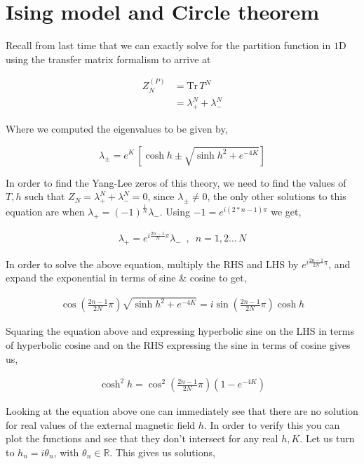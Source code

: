 \documentclass[11pt,a4paper]{article}
\begin{document}
\section{Ising model and Circle theorem}

Recall from last time that we can exactly solve for the partition function in $1$D using the transfer matrix formalism to arrive at

\begin{align}
    Z^{(P)}_N &= \text{Tr} \, T^N \nonumber \\
    &= \lambda^N_+ + \lambda^N_-
\end{align}

Where we computed the eigenvalues to be given by,

\begin{equation}
    \lambda_{\pm} = e^K \, \left[ \cosh{h} \pm \sqrt{\sinh{h}^2 + e^{-4K}} \right] \label{eq:roots}
\end{equation}

In order to find the Yang-Lee zeros of this theory, we need to find the values of $T,h$ such that $Z_N = \lambda^N_+ + \lambda^N_- = 0$, since $\lambda_{\pm} \neq 0$, the only other solutions to this equation are when $\lambda_+ = (-1)^{\frac{1}{N}} \lambda_-$. Using $-1 = e^{i(2*n-1)\pi}$ we get,

\begin{align}
    \lambda_+ =  e^{i \frac{2n-1}{ N}\pi} \lambda_-   \,\,\,,\,\,\, n = 1,2... \, N
\end{align}

In order to solve the above equation, multiply the RHS and LHS by $e^{i \frac{2n-1}{2 N}\pi}$, and expand the exponential in terms of sine \& cosine to get,

\begin{align}
    \cos{\left(\frac{2n-1}{2 N}\pi \right)} \sqrt{\sinh{h}^2 + e^{-4K}} = i \sin{\left(\frac{2n-1}{2 N}\pi \right)} \cosh{h}
\end{align}

Squaring the equation above and expressing hyperbolic sine on the LHS in terms of hyperbolic cosine and on the RHS expressing the sine in terms of cosine gives us,

\begin{align}
    \cosh^2{h} =  \cos^2{\left(\frac{2n-1}{2 N}\pi \right)} \left(1 - e^{-4 K} \right)
\end{align}

Looking at the equation above one can immediately see that there are no solution for real values of the external magnetic field $h$. In order to verify this you can plot the functions and see that they don't intersect for any real $h,K$. Let us turn to $h_n = i \theta_n$, with $\theta_n \in \mathbb{R}$. This gives us solutions,
\end{document}

